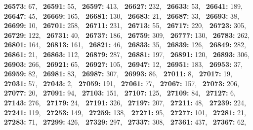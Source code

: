 \textbf{26573:} 67,\allowbreak~ 
\textbf{26591:} 55,\allowbreak~ 
\textbf{26597:} 413,\allowbreak~ 
\textbf{26627:} 232,\allowbreak~ 
\textbf{26633:} 53,\allowbreak~ 
\textbf{26641:} 189,\allowbreak~ 
\textbf{26647:} 45,\allowbreak~ 
\textbf{26669:} 165,\allowbreak~ 
\textbf{26681:} 130,\allowbreak~ 
\textbf{26683:} 21,\allowbreak~ 
\textbf{26687:} 33,\allowbreak~ 
\textbf{26693:} 38,\allowbreak~ 
\textbf{26699:} 10,\allowbreak~ 
\textbf{26701:} 258,\allowbreak~ 
\textbf{26711:} 231,\allowbreak~ 
\textbf{26713:} 55,\allowbreak~ 
\textbf{26717:} 220,\allowbreak~ 
\textbf{26723:} 305,\allowbreak~ 
\textbf{26729:} 122,\allowbreak~ 
\textbf{26731:} 40,\allowbreak~ 
\textbf{26737:} 186,\allowbreak~ 
\textbf{26759:} 309,\allowbreak~ 
\textbf{26777:} 130,\allowbreak~ 
\textbf{26783:} 262,\allowbreak~ 
\textbf{26801:} 164,\allowbreak~ 
\textbf{26813:} 161,\allowbreak~ 
\textbf{26821:} 46,\allowbreak~ 
\textbf{26833:} 35,\allowbreak~ 
\textbf{26839:} 126,\allowbreak~ 
\textbf{26849:} 282,\allowbreak~ 
\textbf{26861:} 21,\allowbreak~ 
\textbf{26863:} 112,\allowbreak~ 
\textbf{26879:} 287,\allowbreak~ 
\textbf{26881:} 197,\allowbreak~ 
\textbf{26891:} 120,\allowbreak~ 
\textbf{26893:} 306,\allowbreak~ 
\textbf{26903:} 266,\allowbreak~ 
\textbf{26921:} 65,\allowbreak~ 
\textbf{26927:} 105,\allowbreak~ 
\textbf{26947:} 12,\allowbreak~ 
\textbf{26951:} 183,\allowbreak~ 
\textbf{26953:} 37,\allowbreak~ 
\textbf{26959:} 82,\allowbreak~ 
\textbf{26981:} 83,\allowbreak~ 
\textbf{26987:} 307,\allowbreak~ 
\textbf{26993:} 86,\allowbreak~ 
\textbf{27011:} 8,\allowbreak~ 
\textbf{27017:} 19,\allowbreak~ 
\textbf{27031:} 57,\allowbreak~ 
\textbf{27043:} 2,\allowbreak~ 
\textbf{27059:} 191,\allowbreak~ 
\textbf{27061:} 77,\allowbreak~ 
\textbf{27067:} 157,\allowbreak~ 
\textbf{27073:} 206,\allowbreak~ 
\textbf{27077:} 20,\allowbreak~ 
\textbf{27091:} 94,\allowbreak~ 
\textbf{27103:} 151,\allowbreak~ 
\textbf{27107:} 125,\allowbreak~ 
\textbf{27109:} 84,\allowbreak~ 
\textbf{27127:} 6,\allowbreak~ 
\textbf{27143:} 276,\allowbreak~ 
\textbf{27179:} 24,\allowbreak~ 
\textbf{27191:} 326,\allowbreak~ 
\textbf{27197:} 207,\allowbreak~ 
\textbf{27211:} 48,\allowbreak~ 
\textbf{27239:} 224,\allowbreak~ 
\textbf{27241:} 119,\allowbreak~ 
\textbf{27253:} 149,\allowbreak~ 
\textbf{27259:} 138,\allowbreak~ 
\textbf{27271:} 95,\allowbreak~ 
\textbf{27277:} 101,\allowbreak~ 
\textbf{27281:} 21,\allowbreak~ 
\textbf{27283:} 71,\allowbreak~ 
\textbf{27299:} 426,\allowbreak~ 
\textbf{27329:} 297,\allowbreak~ 
\textbf{27337:} 308,\allowbreak~ 
\textbf{27361:} 437,\allowbreak~ 
\textbf{27367:} 62,\allowbreak~ 
